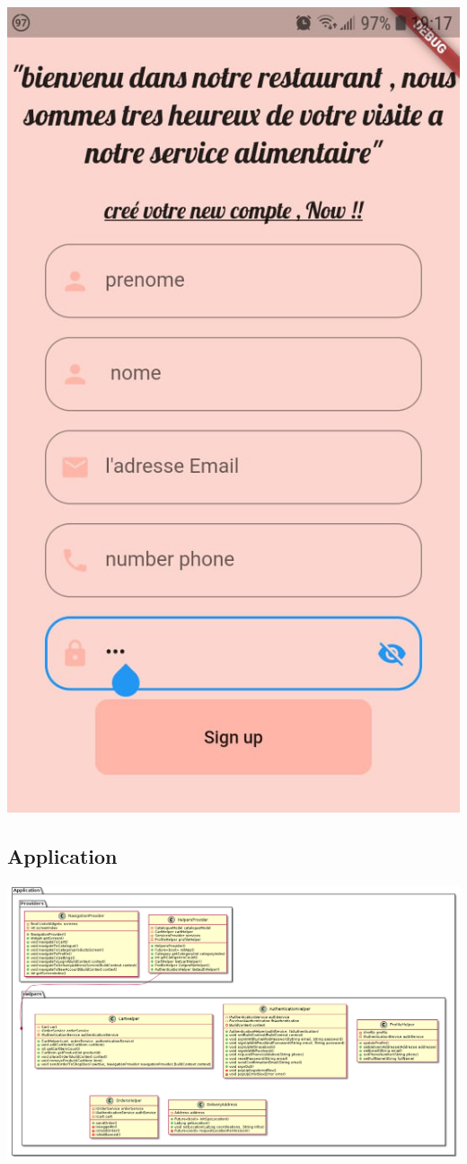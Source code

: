 \documentclass{article}
\begin{document}
\includegraphics[scale=0.3]{./out/MobileApp/Ui/8.png}

\subsection{Application}
\includegraphics[scale=0.3]{./out/MobileApp/Application/Application.png}
\end{document}
